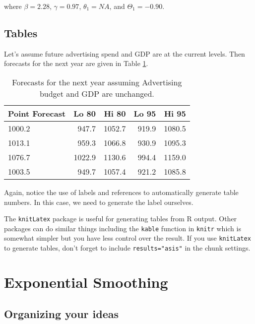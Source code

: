\documentclass{monashthesis}
\begin{document}
where \(\beta = 2.28\), \(\gamma = 0.97\), \(\theta_1 = NA\), and
\(\Theta_1 = -0.90\).

\section{Tables}\label{tables}

Let's assume future advertising spend and GDP are at the current levels.
Then forecasts for the next year are given in Table
\ref{tab:salesforecasts}.

\begin{table}[ht]
\begin{center}
\begin{tabular}{lrrrr}
\toprule
Point Forecast & Lo 80 & Hi 80 & Lo 95 & Hi 95 \\
\midrule
1000.2 &  947.7 & 1052.7 & 919.9 & 1080.5 \\
1013.1 &  959.3 & 1066.8 & 930.9 & 1095.3 \\
1076.7 & 1022.9 & 1130.6 & 994.4 & 1159.0 \\
1003.5 &  949.7 & 1057.4 & 921.2 & 1085.8 \\
\bottomrule
\end{tabular}
\caption{Forecasts for the next year assuming Advertising budget and GDP are unchanged.}
\label{tab:salesforecasts}
\end{center}
\end{table}

Again, notice the use of labels and references to automatically generate
table numbers. In this case, we need to generate the label ourselves.

The \texttt{knitLatex} package is useful for generating tables from R
output. Other packages can do similar things including the
\texttt{kable} function in \texttt{knitr} which is somewhat simpler but
you have less control over the result. If you use \texttt{knitLatex} to
generate tables, don't forget to include \texttt{results="asis"} in the
chunk settings.

\chapter{Exponential Smoothing}\label{sec:expsmooth}

\section{Organizing your ideas}\label{organizing-your-ideas}
\end{document}
